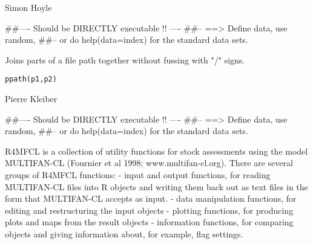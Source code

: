 \documentclass[a4paper]{book}
\begin{document}
%
\begin{Author}\relax

Simon Hoyle
\end{Author}
%
\begin{Examples}
\begin{ExampleCode}
##---- Should be DIRECTLY executable !! ----
##-- ==>  Define data, use random,
##--	or do  help(data=index)  for the standard data sets.

\end{ExampleCode}
\end{Examples}
%
\begin{Description}\relax

Joins parts of a file path together without fussing with "/" signs. 
\end{Description}
%
\begin{Usage}
\begin{verbatim}
ppath(p1,p2)
\end{verbatim}
\end{Usage}
%
\begin{Arguments}
\begin{ldescription}
\item[\code{p1}] 


\item[\code{p2}] 


\end{ldescription}
\end{Arguments}
%
\begin{Author}\relax
Pierre Kleiber

\end{Author}
%
\begin{Examples}
\begin{ExampleCode}
##---- Should be DIRECTLY executable !! ----
##-- ==>  Define data, use random,
##--	or do  help(data=index)  for the standard data sets.

\end{ExampleCode}
\end{Examples}
%
\begin{Description}\relax

R4MFCL is a collection of utility functions for stock assessments using the model MULTIFAN-CL (Fournier et al 1998; www.multifan-cl.org). There are several groups of R4MFCL functions: 
- input and output functions, for reading MULTIFAN-CL files into R objects and writing them back out as text files in the form that MULTIFAN-CL accepts as input. 
- data manipulation functions, for editing and restructuring the input objects 
- plotting functions, for producing plots and maps from the result objects
- information functions, for comparing objects and giving information about, for example, flag settings. 
\end{Description}
\end{document}
